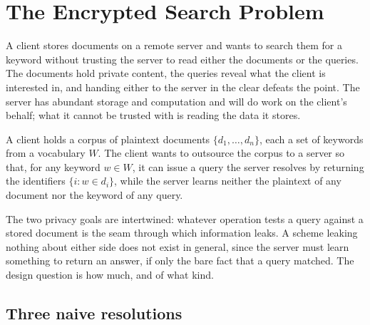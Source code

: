 %

\section{The Encrypted Search Problem}
\label{sec:encrypted-search-problem}

A client stores documents on a remote server and wants to search them for
a keyword without trusting the server to read either the documents or the
queries. The documents hold private content, the queries reveal what the
client is interested in, and handing either to the server in the clear
defeats the point. The server has abundant storage and computation and
will do work on the client's behalf; what it cannot be trusted with is
reading the data it stores.

\begin{definition}
\label{def:encrypted-search}
A client holds a corpus of plaintext documents $\{d_1, \ldots, d_n\}$,
each a set of keywords from a vocabulary $W$. The client wants to
outsource the corpus to a server so that, for any keyword $w \in W$, it
can issue a query the server resolves by returning the identifiers $\{i :
w \in d_i\}$, while the server learns neither the plaintext of any
document nor the keyword of any query.
\end{definition}

The two privacy goals are intertwined: whatever operation tests a query
against a stored document is the seam through which information leaks. A
scheme leaking nothing about either side does not exist in general, since
the server must learn something to return an answer, if only the bare
fact that a query matched. The design question is how much, and of what
kind.

\subsection*{Three naive resolutions}

